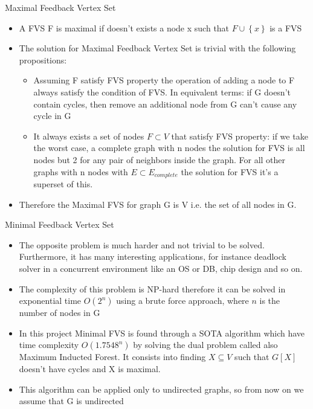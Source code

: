 \documentclass[11pt]{beamer}
\begin{document}
	\begin{frame}{Maximal Feedback Vertex Set}
		\begin{itemize}
			\item A FVS F is maximal if doesn't exists a node x such that $F \cup \left\{ x \right\} $ is a FVS
			\item The solution for Maximal Feedback Vertex Set is trivial with the following propositions:
			\begin{itemize}
				\item Assuming F satisfy FVS property the operation of adding a node to F always satisfy the condition of FVS. In equivalent terms: if G doesn't contain cycles, then remove an additional node from G can't cause any cycle in G 
				\item It always exists a set of nodes $ F \subset V $ that satisfy FVS property: if we take the worst case, a complete graph with n nodes the solution for FVS is all nodes but 2 for any pair of neighbors inside the graph. For all other graphs with n nodes with $ E \subset E_{complete} $ the solution for FVS it's a superset of this.
			\end{itemize}
			\item Therefore the Maximal FVS for graph G is V i.e. the set of all nodes in G.
		\end{itemize}
	\end{frame}
    \begin{frame}{Minimal Feedback Vertex Set}
		\begin{itemize}
			\item The opposite problem is much harder and not trivial to be solved. Furthermore, it has many interesting applications, for instance deadlock solver in a concurrent environment like an OS or DB, chip design and so on.
			\item The complexity of this problem is NP-hard therefore it can be solved in exponential time $O(2^n)$ using a brute force approach, where $ n $ is the number of nodes in G
			\item In this project Minimal FVS is found through a SOTA algorithm \cite{formin} which have time complexity $ O(1.7548^n) $ by solving the dual problem called also Maximum Inducted Forest. It consists into finding $ X \subseteq V $ such that $ G\left[ X \right] $ doesn't have cycles and X is maximal. 
			\item This algorithm can be applied only to undirected graphs, so from now on we assume that G is undirected
		\end{itemize}
    \end{frame}
\end{document}

